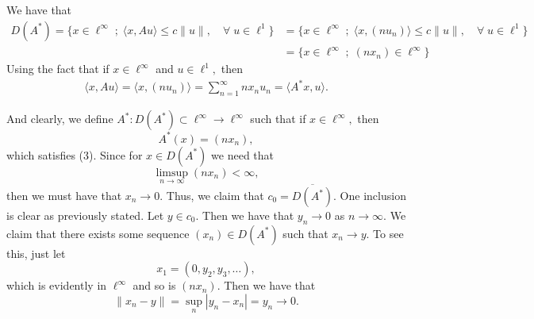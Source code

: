 \documentclass[11pt]{article}
\begin{document}
\begin{solution}

    We have that 
    \begin{align*}
        D(A^*) = \{x \in \ell^\infty \; ; \; \langle x, Au\rangle \leq c\|u\|, \quad \forall \; u\in \ell^1\} &= \{x \in \ell^\infty \; ; \; \langle x, (nu_n)\rangle \leq c\|u\|, \quad \forall \; u\in \ell^1\}\\ &= \{x\in \ell^\infty \; ; \; (nx_n)\in \ell^\infty\}
    \end{align*}
    Using the fact that if $x\in \ell^\infty$ and $u\in \ell^1,$ then 
    \begin{align}
\langle x, Au\rangle = \langle x, (nu_n) \rangle  = \sum_{n=1}^\infty nx_nu_n = \langle A^* x, u\rangle.
    \end{align}
 
    And clearly, we define $A^*: D(A^*) \subset \ell^\infty \to \ell^\infty$ such that if $x\in \ell^\infty,$ then 
    \[A^*(x) =  (nx_n),\] which satisfies  (3). 
Since for $x\in D(A^*)$ we need that \[\limsup_{n\to \infty} (nx_n) < \infty,\] then we must have that $x_n \to 0.$ Thus, we claim that $c_0 = \overline{D(A^*)}.$ One inclusion is clear as previously stated. Let $y\in c_0.$ Then we have that $y_n \to 0$ as $n\to \infty.$ We claim that there exists some sequence $(x_n)\in D(A^*)$ such that $x_n \to y.$ To see this, just let 
\[x_1 = (0, y_2 , y_3, \dots),\] which is evidently in $\ell^\infty$ and so is $(nx_n).$ Then we have that 
\[\|x_n - y\| = \sup_{n}|y_n - x_n| = y_n \to 0.\]
\end{solution}

\newpage
\end{document}
